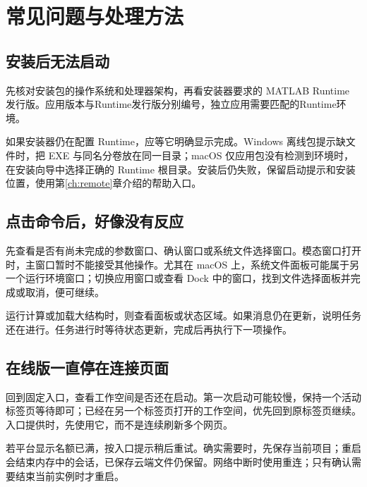 \chapter{常见问题与处理方法}\label{ch:troubleshooting}


\section{安装后无法启动}

先核对安装包的操作系统和处理器架构，再看安装器要求的 MATLAB\regmark{} Runtime 发行版。应用版本与Runtime发行版分别编号，独立应用需要匹配的Runtime环境。

如果安装器仍在配置 Runtime，应等它明确显示完成。Windows 离线包提示缺文件时，把 EXE 与同名分卷放在同一目录；macOS 仅应用包没有检测到环境时，在安装向导中选择正确的 Runtime 根目录。安装后仍失败，保留启动提示和安装位置，使用第\ref{ch:remote}章介绍的帮助入口。

\section{点击命令后，好像没有反应}

先查看是否有尚未完成的参数窗口、确认窗口或系统文件选择窗口。模态窗口打开时，主窗口暂时不能接受其他操作。尤其在 macOS 上，系统文件面板可能属于另一个运行环境窗口；切换应用窗口或查看 Dock 中的窗口，找到文件选择面板并完成或取消，便可继续。

运行计算或加载大结构时，则查看面板或状态区域。如果消息仍在更新，说明任务还在进行。任务进行时等待状态更新，完成后再执行下一项操作。

\section{在线版一直停在连接页面}

回到固定入口，查看工作空间是否还在启动。第一次启动可能较慢，保持一个活动标签页等待即可；已经在另一个标签页打开的工作空间，优先回到原标签页继续。入口提供时，先使用它，而不是连续刷新多个网页。

若平台显示名额已满，按入口提示稍后重试。确实需要时，先保存当前项目；重启会结束内存中的会话，已保存云端文件仍保留。网络中断时使用重连；只有确认需要结束当前实例时才重启。

